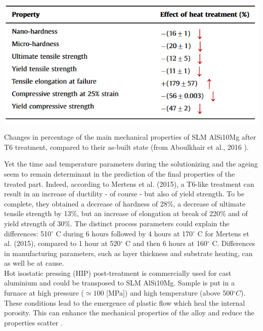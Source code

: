 \begin{table}[ht]
		\centering
			\includegraphics[scale=0.70]{Images/ABvsT6}
			\decoRule
		\caption[Changes in percentage of the main mechanical properties of SLM AlSi10Mg after T6 treatment, , compared to their as-built state] {Changes in percentage of the main mechanical properties of SLM AlSi10Mg after T6 treatment, compared to their as-built state (from Aboulkhair et al., 2016 \parencite{ABOULKHAIR2016139}).}
		\label{tab:ABvsT6}
\end{table}

Yet the time and temperature parameters during the solutionizing and the ageing seem to remain determinant in the prediction of the final properties of the treated part. Indeed, according to Mertens et al. (2015)\cite{Mertens15}, a T6-like treatment can result in an increase of ductility - of course - but also of yield strength. To be complete, they obtained a decrease of hardness of 28\%, a decrease of ultimate tensile strength by 13\%, but an increase of elongation at break of 220\% and of yield strength of 30\%. The distinct process parameters could explain the differences: 510$^\circ$ C during 6 hours followed by 4 hours at 170$^\circ$ C for Mertens et al. (2015)\cite{Mertens15}, compared to 1 hour at 520$^\circ$ C and then 6 hours at 160$^\circ$ C. Differences in manufacturing parameters, such as layer thickness and substrate heating, can as well be at cause.\\

Hot isostatic pressing (HIP) post-treatment is commercially used for cast aluminium and could be transposed to SLM AlSi10Mg. Sample is put in a furnace at high pressure ($\simeq 100$ [MPa]) and high temperature (above 500$^\circ C$). These conditions lead to the emergence of plastic flow which heal the internal porosity. This can enhance the mechanical properties of the alloy and reduce the properties scatter \parencite{HIP}.  \\

